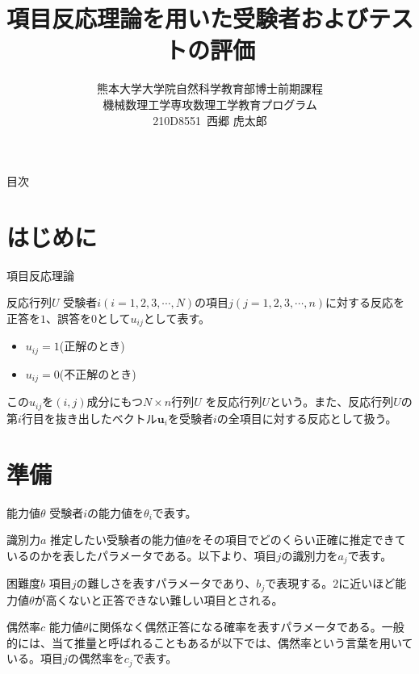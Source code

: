 \documentclass[aspectratio=169, dvipdfmx, 12pt]{beamer}
\title{項目反応理論を用いた受験者およびテストの評価}
\author[西郷虎太郎]{熊本大学大学院自然科学教育部博士前期課程\\機械数理工学専攻数理工学教育プログラム \\ 210D8551\ 西郷 虎太郎}
\date{}
\begin{document}
\frame{\maketitle}

\begin{frame}{目次}
    \tableofcontents
\end{frame}

\section{はじめに}
\begin{frame}{項目反応理論}
  \begin{block}{反応行列$U$}
    受験者$i(i = 1, 2, 3, \cdots, N)$の項目$j(j = 1, 2, 3, \cdots, n)$に対する反応を正答を$1$、誤答を$0$として$u_{ij}$として表す。
    \begin{itemize}
      \item $u_{ij} = 1$(正解のとき)
      \item $u_{ij} = 0$(不正解のとき)
    \end{itemize}
    この$u_{ij}$を$(i,j)$成分にもつ$N\times n$行列$U$ を反応行列$U$という。また、反応行列$U$の第$i$行目を抜き出したベクトル$\boldsymbol{u}_i$を受験者$i$の全項目に対する反応として扱う。
  \end{block}
\end{frame}

\section{準備}
\begin{frame}
    \begin{block}{能力値$\theta$}
      受験者$i$の能力値を$\theta_i$で表す。
    \end{block}
    \begin{block}{識別力$a$}
      推定したい受験者の能力値$\theta$をその項目でどのくらい正確に推定できているのかを表したパラメータである。以下より、項目$j$の識別力を$a_j$で表す。
    \end{block}
    \begin{block}{困難度$b$}
      項目$j$の難しさを表すパラメータであり、$b_j$で表現する。$2$に近いほど能力値$\theta$が高くないと正答できない難しい項目とされる。
    \end{block}
    \begin{block}{偶然率$c$}
      能力値$\theta$に関係なく偶然正答になる確率を表すパラメータである。一般的には、当て推量と呼ばれることもあるが以下では、偶然率という言葉を用いている。項目$j$の偶然率を$c_j$で表す。
    \end{block}

  \end{frame}
\end{document}
